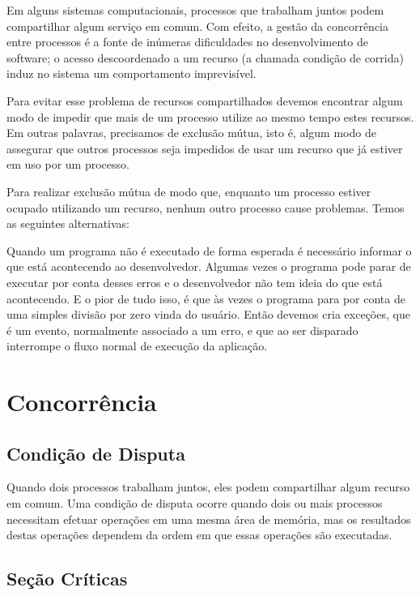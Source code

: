 
Em alguns sistemas computacionais, processos que trabalham juntos podem compartilhar algum 
serviço em comum. Com efeito, a gestão da concorrência entre processos é a fonte de inúmeras 
dificuldades no desenvolvimento de software; o acesso descoordenado a um recurso (a chamada 
condição de corrida) induz no sistema um comportamento imprevisível.

Para evitar esse problema de recursos compartilhados devemos encontrar algum modo de impedir 
que mais de um processo utilize ao mesmo tempo estes recursos. Em outras palavras, precisamos 
de exclusão mútua, isto é, algum modo de assegurar que outros processos seja impedidos de usar 
um recurso que já estiver em uso por um processo.

Para realizar exclusão mútua de modo que, enquanto um processo estiver ocupado utilizando um 
recurso, nenhum outro processo cause problemas. Temos as seguintes alternativas:

Quando um programa não é executado de forma esperada é necessário informar o que está acontecendo ao desenvolvedor. Algumas vezes o programa pode parar de executar por conta desses erros e o desenvolvedor não tem ideia do que está acontecendo. E o pior de tudo isso, é que às vezes o programa para por conta de uma simples divisão por zero vinda do usuário. Então devemos cria exceções, que é um evento, normalmente associado a um erro, e que ao ser disparado interrompe o fluxo normal de execução da aplicação.

\section{Concorrência}

\subsection{Condição de Disputa}

Quando dois processos trabalham juntos, eles podem compartilhar algum recurso em comum. Uma condição de disputa ocorre quando dois ou mais processos necessitam efetuar operações em uma mesma área de memória, mas os resultados destas operações dependem da ordem em que essas operações são executadas.

\subsection{Seção Críticas}

